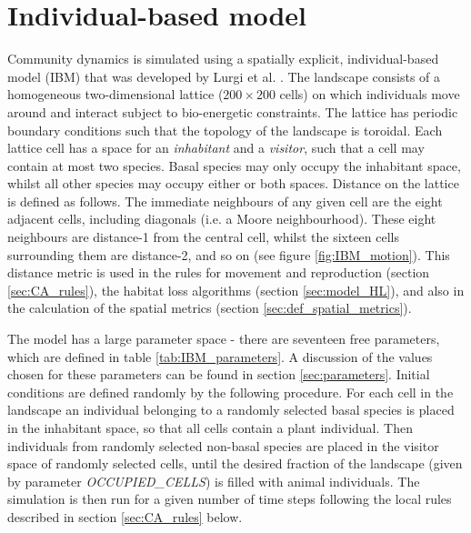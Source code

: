 \section{Individual-based model}
\label{sec:the_model}


Community dynamics is simulated using a spatially explicit, individual-based model (IBM) that was developed by Lurgi et al. \cite{lurgi2015effects}. The landscape consists of a homogeneous two-dimensional lattice ($200 \times 200$ cells) on which individuals move around and interact subject to bio-energetic constraints. The lattice has periodic boundary conditions such that the topology of the landscape is toroidal. Each lattice cell has a space for an \emph{inhabitant} and a \emph{visitor}, such that a cell may contain at most two species. Basal species may only occupy the inhabitant space, whilst all other species may occupy either or both spaces. Distance on the lattice is defined as follows. The immediate neighbours of any given cell are the eight adjacent cells, including diagonals (i.e. a Moore neighbourhood). These eight neighbours are distance-1 from the central cell, whilst the sixteen cells surrounding them are distance-2, and so on (see figure \ref{fig:IBM_motion}). This distance metric is used in the rules for movement and reproduction (section \ref{sec:CA_rules}), the habitat loss algorithms (section \ref{sec:model_HL}), and also in the calculation of the spatial metrics (section \ref{sec:def_spatial_metrics}).




The model has a large parameter space - there are seventeen free parameters, which are defined in table \ref{tab:IBM_parameters}. A discussion of the values chosen for these parameters can be found in section \ref{sec:parameters}. Initial conditions are defined randomly by the following procedure. For each cell in the landscape an individual belonging to a randomly selected basal species is placed in the inhabitant space, so that all cells contain a plant individual. Then individuals from randomly selected non-basal species are placed in the visitor space of randomly selected cells, until the desired fraction of the landscape (given by parameter \emph{OCCUPIED\_CELLS}) is filled with animal individuals. The simulation is then run for a given number of time steps following the local rules described in section \ref{sec:CA_rules} below.

